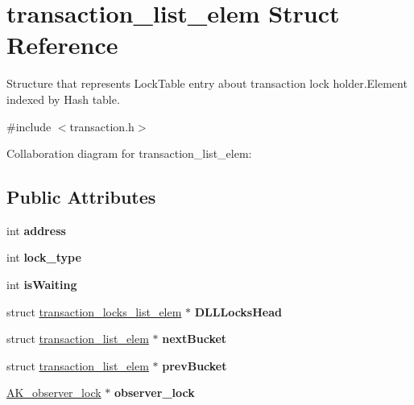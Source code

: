 \hypertarget{structtransaction__list__elem}{}\section{transaction\+\_\+list\+\_\+elem Struct Reference}
\label{structtransaction__list__elem}


Structure that represents Lock\+Table entry about transaction lock holder.\+Element indexed by Hash table.  




{\ttfamily \#include $<$transaction.\+h$>$}



Collaboration diagram for transaction\+\_\+list\+\_\+elem\+:
\subsection*{Public Attributes}
\begin{DoxyCompactItemize}
\item 
int {\bfseries address}\hypertarget{structtransaction__list__elem_abcf5dc09e2f778fed1d8a7cf7055004f}{}\label{structtransaction__list__elem_abcf5dc09e2f778fed1d8a7cf7055004f}

\item 
int {\bfseries lock\+\_\+type}\hypertarget{structtransaction__list__elem_accb49854309cdff0a157d4ab01ac43fc}{}\label{structtransaction__list__elem_accb49854309cdff0a157d4ab01ac43fc}

\item 
int {\bfseries is\+Waiting}\hypertarget{structtransaction__list__elem_a0a732924a2e5cbe3b8568e0e5212f36e}{}\label{structtransaction__list__elem_a0a732924a2e5cbe3b8568e0e5212f36e}

\item 
struct \hyperlink{structtransaction__locks__list__elem}{transaction\+\_\+locks\+\_\+list\+\_\+elem} $\ast$ {\bfseries D\+L\+L\+Locks\+Head}\hypertarget{structtransaction__list__elem_a441dcf09223b92668cadc49f88b08bc6}{}\label{structtransaction__list__elem_a441dcf09223b92668cadc49f88b08bc6}

\item 
struct \hyperlink{structtransaction__list__elem}{transaction\+\_\+list\+\_\+elem} $\ast$ {\bfseries next\+Bucket}\hypertarget{structtransaction__list__elem_a87886aa53e90ddd43a7b6c774c2b801f}{}\label{structtransaction__list__elem_a87886aa53e90ddd43a7b6c774c2b801f}

\item 
struct \hyperlink{structtransaction__list__elem}{transaction\+\_\+list\+\_\+elem} $\ast$ {\bfseries prev\+Bucket}\hypertarget{structtransaction__list__elem_aac101a113a925aa7e9dd75fc15563204}{}\label{structtransaction__list__elem_aac101a113a925aa7e9dd75fc15563204}

\item 
\hyperlink{structobserver__lock}{A\+K\+\_\+observer\+\_\+lock} $\ast$ {\bfseries observer\+\_\+lock}\hypertarget{structtransaction__list__elem_a419ed68310e5b4fffd6629af6512a320}{}\label{structtransaction__list__elem_a419ed68310e5b4fffd6629af6512a320}

\end{DoxyCompactItemize}



